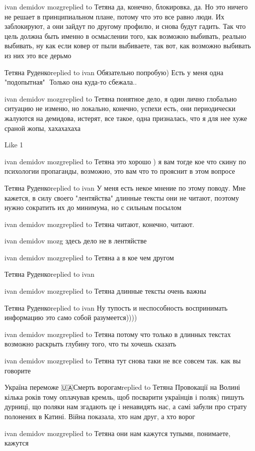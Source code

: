 ivan demidov mozgreplied to Тетяна
да, конечно, блокировка, да. Но это ничего не решает в принципиальном плане, потому что это все равно люди. Их заблокируют, а они зайдут по другому профилю, и снова будут гадить. Так что цель должна быть именно в осмыслении того, как возможно выбивать, реально выбивать, ну как если ковер от пыли выбиваете, так вот, как возможно выбивать из них это все дерьмо

Тетяна Руденкоreplied to ivan
Обязательно попробую) Есть у меня одна "подопытная"🤣 Только она куда-то сбежала..

ivan demidov mozgreplied to Тетяна
понятное дело, я один лично глобально ситуацию не изменю, но локально, конечно, успехи есть, они периодически жалуются на демидова, истерят, все такое, одна призналась, что я для нее хуже сраной жопы, хахахахаха

    Like 1

ivan demidov mozgreplied to Тетяна
это хорошо ) я вам тогде кое что скину по психологии пропаганды, возможно, это вам что то прояснит в этом вопросе

Тетяна Руденкоreplied to ivan
У меня есть некое мнение по этому поводу. Мне кажется, в силу своего "лентяйства" длинные тексты они не читают, поэтому нужно сократить их до минимума, но с сильным посылом

ivan demidov mozgreplied to Тетяна
читают, конечно, читают.

ivan demidov mozg
здесь дело не в лентяйстве

ivan demidov mozgreplied to Тетяна
а в кое чем другом

Тетяна Руденкоreplied to ivan
🤣🤣🤣

ivan demidov mozgreplied to Тетяна
длинные тексты очень важны

Тетяна Руденкоreplied to ivan
Ну тупость и неспособность воспринимать информацию это само собой разумеется))))

ivan demidov mozgreplied to Тетяна
потому что только в длинных текстах возможно раскрыть глубину того, что ты хочешь сказать

ivan demidov mozgreplied to Тетяна
тут снова таки не все совсем так. как вы говорите

Україна переможе 🇺🇦Смерть ворогамreplied to Тетяна
Провокації на Волині кілька років тому оплачував кремль, щоб посварити українців і поляк) пишуть дурниці, що поляки нам згадають це і ненавидять нас, а самі забули про страту полонених в Катині. Війна показала, хто нам друг, а хто ворог

ivan demidov mozgreplied to Тетяна
они нам кажутся тупыми, понимаете, кажутся

